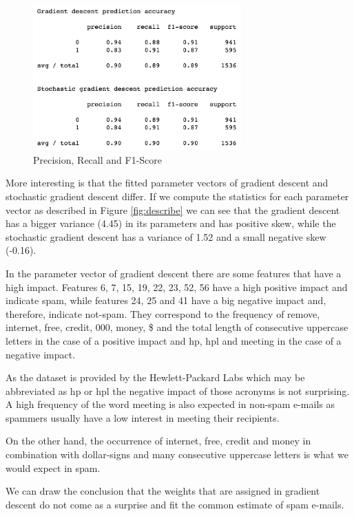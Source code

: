 \documentclass{support/acm_proc_article-sp}
\begin{document}
    \begin{figure}[!htbp]
        \centering
        \includegraphics[width=8cm]{images/results.png}
        \caption{Precision, Recall and F1-Score}
        \label{fig:results}
    \end{figure}

    More interesting is that the fitted parameter vectors of gradient descent and stochastic gradient descent differ.
    If we compute the statistics for each parameter vector as described in Figure \ref{fig:describe} we can see that
    the gradient descent has a bigger variance (4.45) in its parameters and has positive skew, while the stochastic
    gradient descent has a variance of 1.52 and a small negative skew (-0.16).

    In the parameter vector of gradient descent there are some features that have a high impact.
    Features 6, 7, 15, 19, 22, 23, 52, 56 have a high positive impact and indicate spam, while features 24, 25 and 41 have
    a big negative impact and, therefore, indicate not-spam.
    They correspond to the frequency of remove, internet, free, credit, 000, money, \$ and the total length of consecutive
    uppercase letters in the case of a positive impact and hp, hpl and meeting in the case of a negative impact.

    As the dataset is provided by the Hewlett-Packard Labs which may be abbreviated as hp or hpl the negative impact of
    those acronyms is not surprising.
    A high frequency of the word meeting is also expected in non-spam e-mails as spammers usually have a low interest in
    meeting their recipients.

    On the other hand, the occurrence of internet, free, credit and money in combination with dollar-signs and many consecutive
    uppercase letters is what we would expect in spam.

    We can draw the conclusion that the weights that are assigned in gradient descent do not come as a surprise and fit
    the common estimate of spam e-mails.
\end{document}
